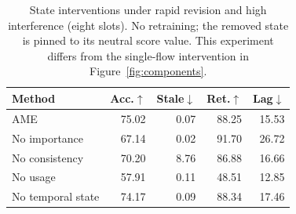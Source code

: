 \begin{table}[t]
\centering\small
\caption{State interventions under rapid revision and high interference (eight slots). No retraining; the removed state is pinned to its neutral score value. This experiment differs from the single-flow intervention in Figure~\ref{fig:components}.}\label{tab:ablation}
\begin{tabular}{lrrrr}\toprule
Method & Acc.$\uparrow$ & Stale$\downarrow$ & Ret.$\uparrow$ & Lag$\downarrow$\\\midrule
AME & 75.02 & 0.07 & 88.25 & 15.53\\
No importance & 67.14 & 0.02 & 91.70 & 26.72\\
No consistency & 70.20 & 8.76 & 86.88 & 16.66\\
No usage & 57.91 & 0.11 & 48.51 & 12.85\\
No temporal state & 74.17 & 0.09 & 88.34 & 17.46\\
\bottomrule\end{tabular}

\end{table}
